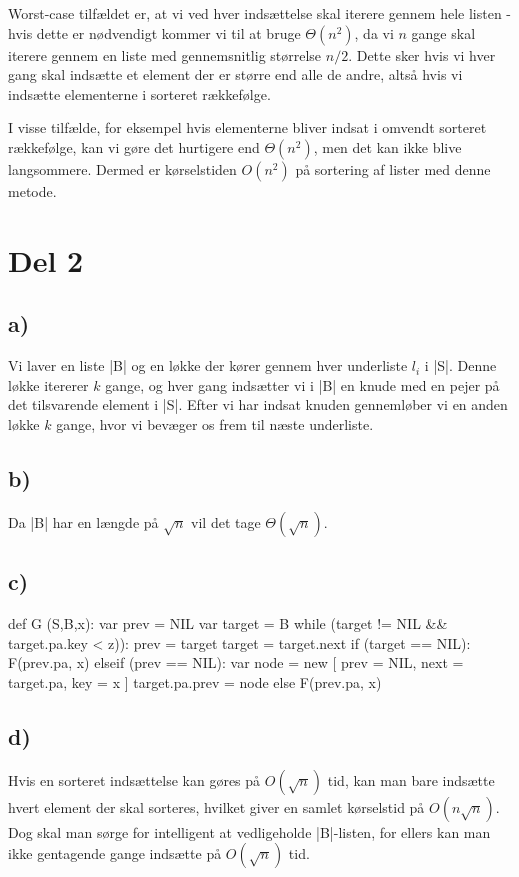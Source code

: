 \documentclass[a4paper]{article}
\begin{document}
Worst-case tilfældet er, at vi ved hver indsættelse skal iterere gennem hele listen - hvis dette er nødvendigt kommer vi til at bruge $\Theta(n^2)$, da vi $n$ gange skal iterere gennem en liste med gennemsnitlig størrelse $n/2$. Dette sker hvis vi hver gang skal indsætte et element der er større end alle de andre, altså hvis vi indsætte elementerne i sorteret rækkefølge.

I visse tilfælde, for eksempel hvis elementerne bliver indsat i omvendt sorteret rækkefølge, kan vi gøre det hurtigere end $\Theta(n^2)$, men det kan ikke blive langsommere. Dermed er kørselstiden $O(n^2)$ på sortering af lister med denne metode.

\section{Del 2}

\subsection{a)}

Vi laver en liste \code|B| og en løkke der kører gennem hver underliste $l_i$ i \code|S|. Denne løkke itererer $k$ gange, og hver gang indsætter vi i \code|B| en knude med en pejer på det tilsvarende element i \code|S|. Efter vi har indsat knuden gennemløber vi en anden løkke $k$ gange, hvor vi bevæger os frem til næste underliste.

\subsection{b)}

Da \code|B| har en længde på $\sqrt{n}$ vil det tage $\Theta(\sqrt{n})$.

\subsection{c)}

\begin{Code}
def G (S,B,x): 
	var prev = NIL
	var target = B
	while (target != NIL && target.pa.key < z)):
		prev = target
		target = target.next
	if (target == NIL):
		F(prev.pa, x)
	elseif (prev == NIL):
		var node = new [
			prev = NIL,
			next = target.pa,
			key = x
		]
		target.pa.prev = node
	else
		F(prev.pa, x)
\end{Code}

\subsection{d)}

Hvis en sorteret indsættelse kan gøres på $O(\sqrt{n})$ tid, kan man bare indsætte hvert element der skal sorteres, hvilket giver en samlet kørselstid på $O(n \sqrt{n})$. Dog skal man sørge for intelligent at vedligeholde \code|B|-listen, for ellers kan man ikke gentagende gange indsætte på $O(\sqrt{n})$ tid. 
\end{document}
